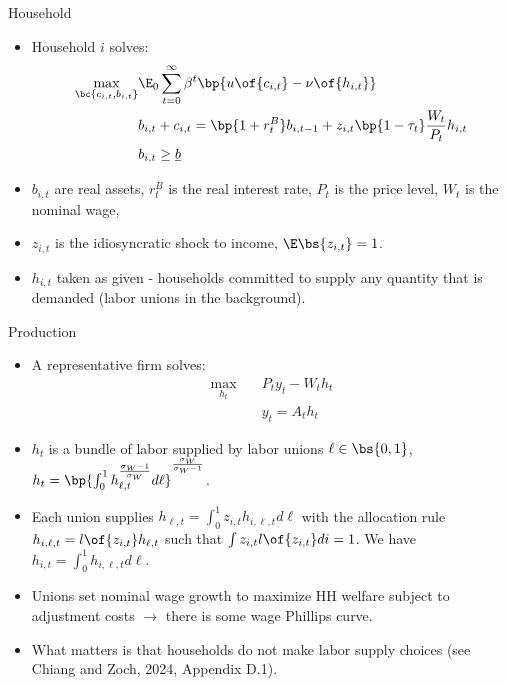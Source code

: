 \documentclass[11pt,xcolor={dvipsnames},aspectratio=159,hyperref={pdftex,pdfpagemode=UseNone,hidelinks,pdfdisplaydoctitle=true},usepdftitle=false]{beamer}
\begin{document}
\begin{frame}{Household}
    \begin{itemize}
     \item Household $i$ solves:
     \begin{align*}
        \max_{\bc{c_{i,t},b_{i,t}}} & \E_0 \sum_{t=0}^\infty \beta^t \bp{u\of{c_{i,t}}- \nu\of{h_{i,t}}} \\
        & b_{i,t} + c_{i,t} = \bp{1+r^B_{t}} b_{i,t-1} + z_{i,t} \bp{1-\tau_t}\frac{W_t}{P_t} h_{i,t} \\
        & b_{i,t} \geq \underline{b} 
        \end{align*}
            \item $b_{i,t}$ are real assets, $r^B_t$ is the real interest rate, $P_t$ is the price level, $W_t$ is the nominal wage, 
            \item $z_{i,t}$ is the idiosyncratic shock to income, $\E\bs{z_{i,t}} = 1$.
            \item $h_{i,t}$ taken as given - households committed to supply any quantity that is demanded (labor unions in the background).
        \end{itemize}
\end{frame}

\begin{frame}{Production}
    \begin{itemize}
     \item A representative firm solves: 
        \begin{align*}
        \max_{h_t} \quad & P_t y_t - W_t h_t \\
        & y_t = A_t h_t \end{align*} \vspace{-1cm}
            \item $h_t$ is a bundle of labor supplied by labor unions  $\ell\in\bs{0,1}$, $h_t = \bp{\int^1_0 h_{\ell,t}^{\frac{\sigma_W-1}{\sigma_W}} d\ell}^{\frac{\sigma_W}{\sigma_W-1}}$.
            \item Each union supplies $h_{\ell,t}=\int^1_0 z_{i,t} h_{i,\ell,t} d\ell$ with the allocation rule $h_{i,\ell,t} = l\of{z_{i,t}} h_{\ell,t}$ such that $\int z_{i,t} l\of{z_{i,t}}di =1$. We have $h_{i,t} = \int^1_0 h_{i,\ell,t} d\ell $. 
            \item Unions set nominal wage growth to maximize HH welfare subject to adjustment costs $\rightarrow$ there is some wage Phillips curve. 
            \item What  matters is that households do not make labor supply choices (see Chiang and Zoch, 2024, Appendix D.1).
        \end{itemize}
\end{frame}
\end{document}
